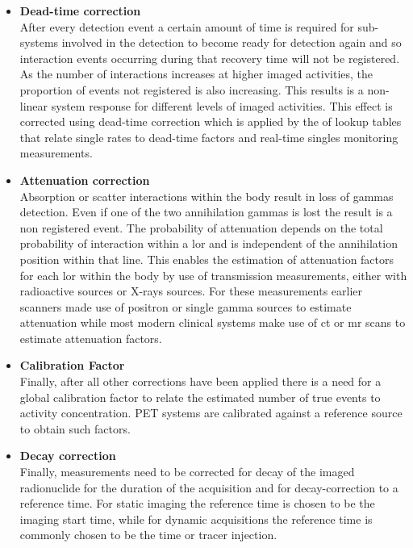 \begin{itemize}
\item\textbf{Dead-time correction}\\
After every detection event a certain amount of time is required for sub-systems involved in the detection to become ready for detection again and so interaction events occurring during that recovery time will not be registered. As the number of interactions increases at higher imaged activities, the proportion of events not registered is also increasing. This results is a non-linear system response for different levels of imaged activities. This effect is corrected using dead-time correction which is applied by the of lookup tables that relate single rates to dead-time factors and real-time singles monitoring measurements.
\item\textbf{Attenuation correction}\\
Absorption or scatter interactions within the body result in loss of gammas detection. Even if one of the two annihilation gammas is lost the result is a non registered event. The probability of attenuation depends on the total probability of interaction within a \gls{lor} and is independent of the annihilation position within that line. This enables the estimation of attenuation factors for each \gls{lor} within the body by use of transmission measurements, either with radioactive sources or X-rays sources. For these measurements earlier scanners made use of positron or single gamma sources to estimate attenuation while most modern clinical systems make use of \gls{ct} or \gls{mr} scans to estimate attenuation factors. 
\item\textbf{Calibration Factor}\\
Finally, after all other corrections have been applied there is a need for a global calibration factor to relate the estimated number of true events to activity concentration. 
PET systems are calibrated against a reference source to obtain such factors. 
\item\textbf{Decay correction}\\
Finally, measurements need to be corrected for decay of the imaged radionuclide for the duration of the acquisition and for decay-correction to a reference time. 
For static imaging the reference time is chosen to be the imaging start time, while for dynamic acquisitions the reference time is commonly chosen to be the time or tracer injection. 
\end{itemize}

